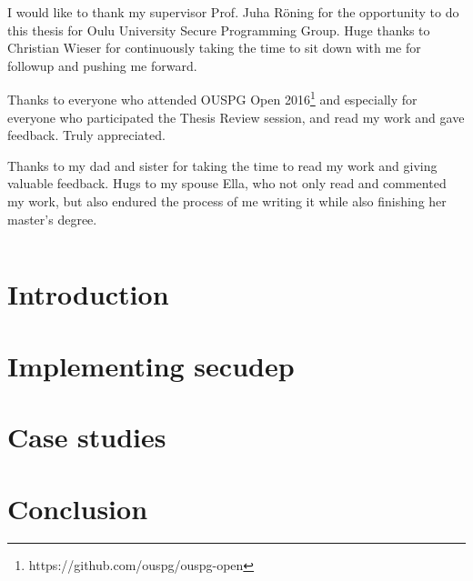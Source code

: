 \documentclass[a4paper,12pt,titlepage]{dithesis}
\begin{document}
I would like to thank my supervisor Prof. Juha Röning for the
opportunity to do this thesis for Oulu University Secure Programming
Group. Huge thanks to Christian Wieser for continuously taking the
time to sit down with me for followup and pushing me forward.

Thanks to everyone who attended OUSPG Open
2016\footnote{https://github.com/ouspg/ouspg-open} and especially for
everyone who participated the Thesis Review session, and read my work
and gave feedback. Truly appreciated.

Thanks to my dad and sister for taking the time to read my work and
giving valuable feedback. Hugs to my spouse Ella, who not only read
and commented my work, but also endured the process of me writing it
while also finishing her master's degree.




\setlongtables
\begin{longtable}[l]{p{3cm}p{}}
  
\end{longtable}
\setcounter{table}{0}

\chapter{Introduction}
\sivunumerot{}

\chapter{Implementing secudep}

\chapter{Case studies}


\chapter{Conclusion}



\end{document}
